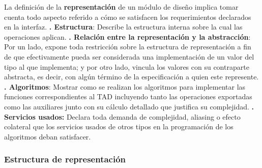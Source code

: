 \documentclass[10pt,a4paper]{article}
\begin{document}
La definición de la \textbf{representación} de un módulo de diseño implica tomar cuenta todo aspecto referido a cómo se satisfacen los requerimientos declarados en la interfaz.
\newline
\newline
\textbf{. Estructura}: Describe la estructura interna sobre la cual las operaciones aplican.
\newline
\newline
\textbf{. Relación entre la representación y la abstracción}: Por un lado, expone toda restricción sobre la estructura de representación a fin de que efectivamente pueda ser considerada una implementación de un valor del tipo al que implementa; y por otro lado, vincula los valores con su contraparte abstracta, es decir, con algún término de la especificación a quien este represente.
\newline
\newline
\textbf{. Algoritmos}: Mostrar como se realizan los algoritmos para implementar las funciones correspondientes al TAD incluyendo tanto las operaciones exportadas como las auxiliares junto con su cálculo detallado que justifica su complejidad. 
\newline
\newline
\textbf{. Servicios usados:} Declara toda demanda de complejidad, aliasing o efecto colateral que los servicios usados de otros tipos en la programación de los algoritmos deban satisfacer. 

\subsubsection{Estructura de representación}
\end{document}
